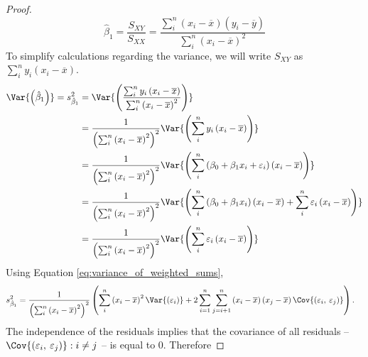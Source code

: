 \documentclass{article}
\begin{document}
\begin{proof}
\begin{equation*}
        \hat{\beta}_1 = \frac{S_{XY}}{S_{XX}} = \frac{\sum_i^n \left( x_i - \overline{x} \right) \left( y_i - \overline{y} \right)}{\sum_i^n \left( x_i - \overline{x} \right)^2}
    \end{equation*}
    To simplify calculations regarding the variance, we will write $S_{XY}$ as $\sum_i^n y_i \left( x_i - \overline{x} \right)$.
    \begin{align*}
        \Var{\left( \hat{\beta}_1 \right)} = s_{\hat{\beta}_1}^2 & = \Var{\left( \frac{\sum_i^n y_i \left( x_i - \overline{x} \right)}{\sum_i^n \left( x_i - \overline{x} \right)^2} \right)}                                                                                                               \\
                                                                 & = \frac{1}{\left( \sum_i^n \left( x_i - \overline{x} \right)^2 \right)^2} \Var{\left( \sum_i^n y_i \left( x_i - \overline{x} \right) \right)}                                                                                            \\
                                                                 & = \frac{1}{\left( \sum_i^n \left( x_i - \overline{x} \right)^2 \right)^2} \Var{\left( \sum_i^n \left( \beta_0 + \beta_1x_i + \varepsilon_i \right) \left( x_i - \overline{x} \right) \right)}                                            \\
                                                                 & = \frac{1}{\left( \sum_i^n \left( x_i - \overline{x} \right)^2 \right)^2} \Var{\left( \sum_i^n \left( \beta_0 + \beta_1x_i \right) \left( x_i - \overline{x} \right) + \sum_i^n \varepsilon_i \left( x_i - \overline{x} \right) \right)} \\
                                                                 & = \frac{1}{\left( \sum_i^n \left( x_i - \overline{x} \right)^2 \right)^2} \Var{\left( \sum_i^n \varepsilon_i \left( x_i - \overline{x} \right) \right)}
    \end{align*}
    Using Equation \ref{eq:variance_of_weighted_sums},
    \begin{align*}
        s_{\hat{\beta}_1}^2 & = \frac{1}{\left( \sum_i^n \left( x_i - \overline{x} \right)^2 \right)^2} \left( \sum_i^n \left( x_i - \overline{x} \right)^2 \Var{\left( \varepsilon_i \right)} + 2\sum_{i=1}^n\sum_{j=i+1}^n\left( x_i - \overline{x} \right)\left( x_j - \overline{x} \right)\Cov{\left(\varepsilon_i,\: \varepsilon_j\right)} \right).
    \end{align*}
    The independence of the residuals implies that the covariance of all residuals -- $\Cov{\left( \varepsilon_i,\: \varepsilon_j \right)}:i \neq j$ -- is equal to 0. Therefore

\end{proof}
\end{document}
